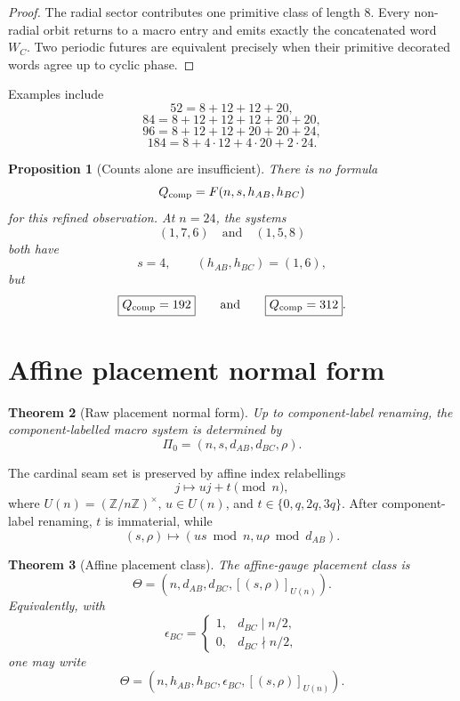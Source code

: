 \documentclass[11pt,a4paper]{article}
\newtheorem{theorem}{Theorem}
\newtheorem{proposition}[theorem]{Proposition}
\theoremstyle{definition}
\newcommand{\ZZ}{\mathbb Z}
\begin{document}
\begin{proof}
The radial sector contributes one primitive class of length \(8\).
Every non-radial orbit returns to a macro entry and emits exactly the concatenated word \(W_C\).
Two periodic futures are equivalent precisely when their primitive decorated words agree up to cyclic phase.
\end{proof}

Examples include
\[
52=8+12+12+20,
\]
\[
84=8+12+12+12+20+20,
\]
\[
96=8+12+12+20+20+24,
\]
\[
184=8+4\cdot12+4\cdot20+2\cdot24.
\]

\begin{proposition}[Counts alone are insufficient]\label{prop:192312}
There is no formula
\[
Q_{\rm comp}=F(n,s,h_{AB},h_{BC})
\]
for this refined observation.
At \(n=24\), the systems
\[
(1,7,6)
\quad\text{and}\quad
(1,5,8)
\]
both have
\[
s=4,\qquad(h_{AB},h_{BC})=(1,6),
\]
but
\[
\boxed{Q_{\rm comp}=192}
\qquad\text{and}\qquad
\boxed{Q_{\rm comp}=312}.
\]
\end{proposition}

\section{Affine placement normal form}\label{sec:placement}

\begin{theorem}[Raw placement normal form]\label{thm:rawplacement}
Up to component-label renaming, the component-labelled macro system is determined by
\[
\boxed{
\Pi_0=(n,s,d_{AB},d_{BC},\rho).
}
\]
\end{theorem}

The cardinal seam set is preserved by affine index relabellings
\[
j\mapsto uj+t\pmod n,
\]
where \(U(n)=(\ZZ/n\ZZ)^\times\), \(u\in U(n)\), and \(t\in\{0,q,2q,3q\}\).
After component-label renaming, \(t\) is immaterial, while
\[
(s,\rho)\mapsto
(us\bmod n,u\rho\bmod d_{AB}).
\]

\begin{theorem}[Affine placement class]\label{thm:affine}
The affine-gauge placement class is
\[
\boxed{
\Theta=
\left(
n,d_{AB},d_{BC},[(s,\rho)]_{U(n)}
\right).
}
\]
Equivalently, with
\[
\epsilon_{BC}=
\begin{cases}
1,&d_{BC}\mid n/2,\\
0,&d_{BC}\nmid n/2,
\end{cases}
\]
one may write
\[
\Theta=
\left(
n,h_{AB},h_{BC},\epsilon_{BC},[(s,\rho)]_{U(n)}
\right).
\]
\end{theorem}
\end{document}
